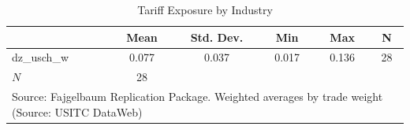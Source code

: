 \begin{table}[htbp]\centering
\def\sym#1{\ifmmode^{#1}\else\(^{#1}\)\fi}
\caption{Tariff Exposure by Industry}
\begin{tabular}{l*{1}{ccccc}}
\hline\hline
            &        Mean&   Std. Dev.&         Min&         Max&           N\\
\hline
dz\_usch\_w   &       0.077&       0.037&       0.017&       0.136&          28\\
\hline
\(N\)       &          28&            &            &            &            \\
\hline\hline
\multicolumn{6}{l}{\footnotesize Source: Fajgelbaum Replication Package. Weighted averages by trade weight (Source: USITC DataWeb)}\\
\end{tabular}
\end{table}
